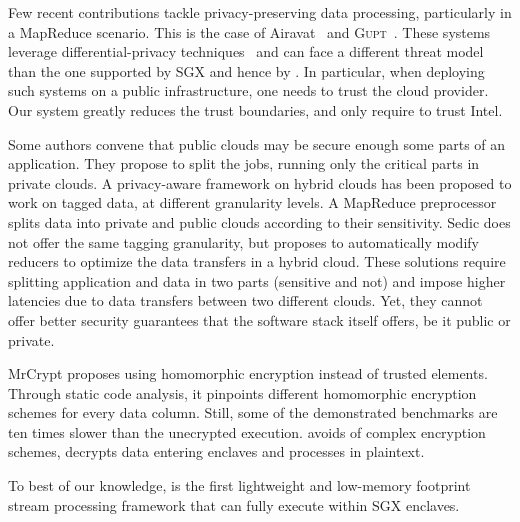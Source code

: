 Few recent contributions tackle privacy-preserving data processing, particularly in a MapReduce scenario.
This is the case of Airavat~\cite{Roy:2010:ASP:1855711.1855731} and \textsc{Gupt}~\cite{Mohan:2012:GPP:2213836.2213876}.
These systems leverage differential-privacy techniques~\cite{dwork2006calibrating} and can face a different threat model than the one supported by SGX and hence by \SYS.
In particular, when deploying such systems on a public infrastructure, one needs to trust the cloud provider.
Our system greatly reduces the trust boundaries, and only require to trust Intel.

Some authors convene that public clouds may be secure enough some parts of an application.
They propose to split the jobs, running only the critical parts in private clouds.
A privacy-aware framework on hybrid clouds \cite{xu2015framework} has been proposed to work on tagged data, at different granularity levels.
A MapReduce preprocessor splits data into private and public clouds according to their sensitivity.
Sedic \cite{zhang2011sedic} does not offer the same tagging granularity, but proposes to automatically modify reducers to optimize the data transfers in a hybrid cloud.
These solutions require splitting application and data in two parts (sensitive and not) and impose higher latencies due to data transfers between two different clouds.
Yet, they cannot offer better security guarantees that the software stack itself offers, be it public or private.

MrCrypt \cite{tetali2013mrcrypt} proposes using homomorphic encryption instead of trusted elements.
Through static code analysis, it pinpoints different homomorphic encryption schemes for every data column.
Still, some of the demonstrated benchmarks are ten times slower than the unecrypted execution.
\SYS{} avoids of complex encryption schemes, decrypts data entering enclaves and processes in plaintext.

To best of our knowledge, \SYS{} is the first lightweight and low-memory footprint stream processing framework that can fully execute within SGX enclaves.
